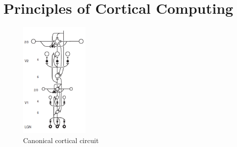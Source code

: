 \documentclass[12pt,twoside]{article}
\theoremstyle{plain}
\theoremstyle{definition}
\theoremstyle{remark}
\begin{document}
\section{Principles of Cortical Computing}
\label{sec:Cortical Computing}
\begin{figure}
	\begin{center}
		\includegraphics[width=0.3\textwidth]{canonicalcircuit}
	\end{center}
  \caption{Canonical cortical circuit}
  \label{fig:cortical_circuit}
\end{figure}
\end{document}
